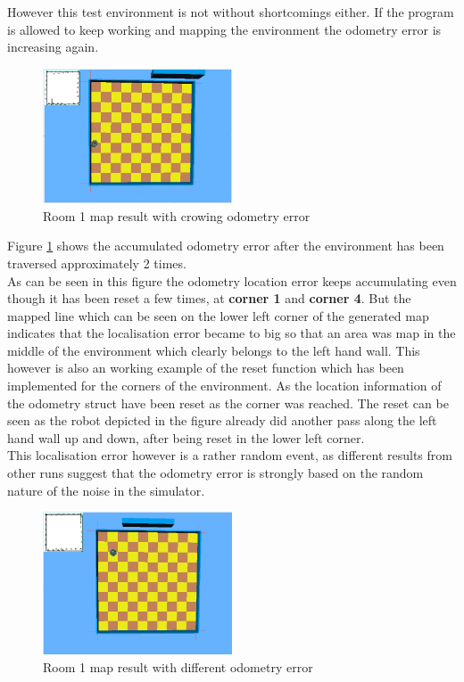 However this test environment is not without shortcomings either. If the program is allowed to keep working and mapping the environment the odometry error is increasing again.\\

\begin{figure}[h]
\centering
\includegraphics[width = 0.5\textwidth]{../../figures/map_results/odometry_error_and_reset.png} 
\caption{Room 1 map result with crowing odometry error}
\label{room1_empty_reset}
\end{figure}

Figure \ref{room1_empty_reset} shows the accumulated odometry error after the environment has been traversed approximately 2 times. \\
As can be seen in this figure the odometry location error keeps accumulating even though it has been reset a few times, at \textbf{corner 1} and \textbf{corner 4}. But the mapped line which can be seen on the lower left corner of the generated map indicates that the localisation error became to big so  that an area was map in the middle of the environment which clearly belongs to the left hand wall. 
This however is also an working example of the reset function which has been implemented for the corners of the environment. As the location information of the odometry struct have been reset as the corner was reached. The reset can be seen as the robot depicted in the figure already did another pass along the left hand wall up and down, after being reset in the lower left corner. \\[3ex]

This localisation error however is a rather random event, as different results from other runs suggest that the odometry error is strongly based on the random nature of the noise in the simulator. 

\begin{figure}[h]
\centering
\includegraphics[width = 0.5\textwidth]{../../figures/map_results/simulator_noise_mapping.png} 
\caption{Room 1 map result with different odometry error}
\label{room1_simulator_noise}
\end{figure}

